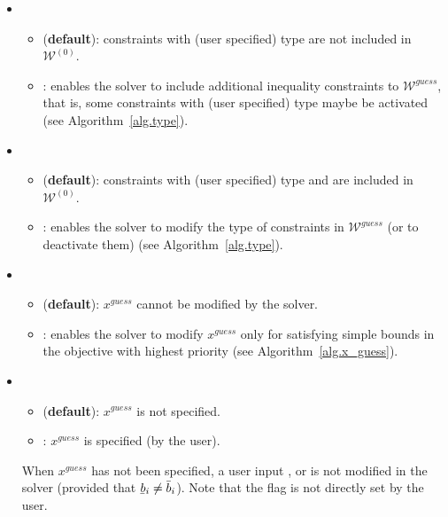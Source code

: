 \documentclass[12pt,a4paper]{article}
\newcommand{\ubar}[1]{\underaccent{\bar}{#1}}
\begin{document}
\begin{itemize}

\item {}

  \begin{itemize}
  \item[\ding{237}]  ({\bf default}): constraints with (user specified) type  are not included in $\mathcal{W}^{(0)}$.
  \item[\ding{237}] : enables the solver to include additional inequality constraints to
    $\mathcal{W}^{\mathit{guess}}$, that is, some constraints with (user specified) type
     maybe be activated (see Algorithm~\ref{alg.type}).
  \end{itemize}

\item {}

  \begin{itemize}
  \item[\ding{237}]  ({\bf default}): constraints with (user specified) type  and  are included in $\mathcal{W}^{(0)}$.
  \item[\ding{237}] : enables the solver to modify the type of constraints in $\mathcal{W}^{\mathit{guess}}$ (or to deactivate them) (see Algorithm~\ref{alg.type}).
  \end{itemize}

\item {}

  \begin{itemize}
  \item[\ding{237}]  ({\bf default}): $x^{\mathit{guess}}$ cannot be modified by the solver.
  \item[\ding{237}] : enables the solver to modify $x^{\mathit{guess}}$ only for satisfying simple
    bounds in the objective with highest priority (see Algorithm~\ref{alg.x_guess}).
  \end{itemize} 

\item {}

  \begin{itemize}
  \item[\ding{237}]  ({\bf default}): $x^{\mathit{guess}}$ is not specified.

  \item[\ding{237}] : $x^{\mathit{guess}}$ is specified (by the user).

  \end{itemize} 

  \noindent When $x^{\mathit{guess}}$ has not been specified, a user input ,
   or  is not modified in the solver (provided that
  $\ubar{b}_i \neq \bar{b}_i$). Note that the flag  is not directly set
  by the user.
  
\end{itemize}
\end{document}
